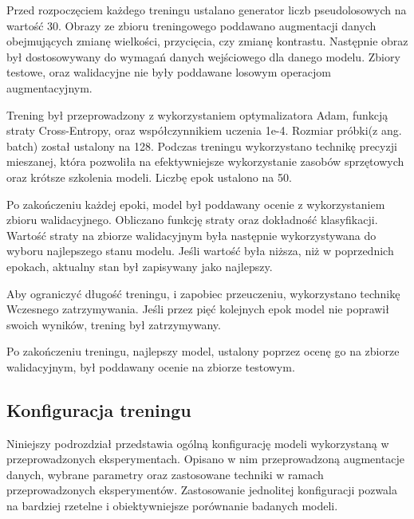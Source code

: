 Przed rozpoczęciem każdego treningu ustalano generator liczb pseudolosowych na wartość 30. Obrazy ze zbioru treningowego poddawano augmentacji danych obejmujących zmianę wielkości, przycięcia, czy zmianę kontrastu. Następnie obraz był dostosowywany do wymagań danych wejściowego dla danego modelu. Zbiory testowe, oraz walidacyjne nie były poddawane losowym operacjom augmentacyjnym.

Trening był przeprowadzony z wykorzystaniem optymalizatora Adam, funkcją straty Cross-Entropy, oraz współczynnikiem uczenia 1e-4. Rozmiar próbki(z ang. batch) został ustalony na 128. Podczas treningu wykorzystano technikę precyzji mieszanej, która pozwoliła na efektywniejsze wykorzystanie zasobów sprzętowych oraz krótsze szkolenia modeli. Liczbę epok ustalono na 50.

Po zakończeniu każdej epoki, model był poddawany ocenie z wykorzystaniem zbioru walidacyjnego. Obliczano funkcję straty oraz dokładność klasyfikacji. Wartość straty na zbiorze walidacyjnym była następnie wykorzystywana do wyboru najlepszego stanu modelu. Jeśli wartość była niższa, niż w poprzednich epokach, aktualny stan był zapisywany jako najlepszy.

Aby ograniczyć długość treningu, i zapobiec przeuczeniu, wykorzystano technikę Wczesnego zatrzymywania. Jeśli przez pięć kolejnych epok model nie poprawił swoich wyników, trening był zatrzymywany. 

Po zakończeniu treningu, najlepszy model, ustalony poprzez ocenę go na zbiorze walidacyjnym, był poddawany ocenie na zbiorze testowym. 



\subsection{Konfiguracja treningu}
Niniejszy podrozdział przedstawia ogólną konfigurację modeli wykorzystaną w przeprowadzonych eksperymentach. Opisano w nim przeprowadzoną augmentacje danych, wybrane parametry oraz zastosowane techniki w ramach przeprowadzonych eksperymentów. Zastosowanie jednolitej konfiguracji pozwala na bardziej rzetelne i obiektywniejsze porównanie badanych modeli. 
